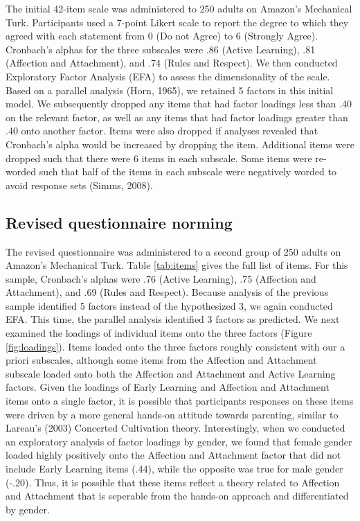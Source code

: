 \documentclass[10pt, letterpaper]{article}
\begin{document}
The initial 42-item scale was administered to 250 adults on Amazon's
Mechanical Turk. Participants used a 7-point Likert scale to report the
degree to which they agreed with each statement from 0 (Do not Agree) to
6 (Strongly Agree). Cronbach's alphas for the three subscales were .86
(Active Learning), .81 (Affection and Attachment), and .74 (Rules and
Respect). We then conducted Exploratory Factor Analysis (EFA) to assess
the dimensionality of the scale. Based on a parallel analysis (Horn,
1965), we retained 5 factors in this initial model. We subsequently
dropped any items that had factor loadings less than .40 on the relevant
factor, as well as any items that had factor loadings greater than .40
onto another factor. Items were also dropped if analyses revealed that
Cronbach's alpha would be increased by dropping the item. Additional
items were dropped such that there were 6 items in each subscale. Some
items were re-worded such that half of the items in each subscale were
negatively worded to avoid response sets (Simms, 2008).

\subsection{Revised questionnaire
norming}\label{revised-questionnaire-norming}

The revised questionnaire was administered to a second group of 250
adults on Amazon's Mechanical Turk. Table \ref{tab:items} gives the full
list of items. For this sample, Cronbach's alphas were .76 (Active
Learning), .75 (Affection and Attachment), and .69 (Rules and Respect).
Because analysis of the previous sample identified 5 factors instead of
the hypothesized 3, we again conducted EFA. This time, the parallel
analysis identified 3 factors as predicted. We next examined the
loadings of individual items onto the three factors (Figure
\ref{fig:loadings}). Items loaded onto the three factors roughly
consistent with our a priori subscales, although some items from the
Affection and Attachment subscale loaded onto both the Affection and
Attachment and Active Learning factors. Given the loadings of Early
Learning and Affection and Attachment items onto a single factor, it is
possible that participants responses on these items were driven by a
more general hands-on attitude towards parenting, similar to Lareau's
(2003) Concerted Cultivation theory. Interestingly, when we conducted an
exploratory analysis of factor loadings by gender, we found that female
gender loaded highly positively onto the Affection and Attachment factor
that did not include Early Learning items (.44), while the opposite was
true for male gender (-.20). Thus, it is possible that these items
reflect a theory related to Affection and Attachment that is seperable
from the hands-on approach and differentiated by gender.
\end{document}
